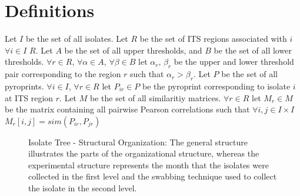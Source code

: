 \documentclass[12pt]{ucthesis}
\begin{document}
   \section{Definitions}\label{sec:definitions}
      Let $I$ be the set of all isolates. Let $R$ be the set of ITS regions
      associated with $i$ $\forall i \in I$ $R$. Let $A$ be the set of all upper
      thresholds, and $B$ be the set of all lower thresholds. $\forall r \in R$,
      $\forall \alpha \in A$, $\forall \beta \in B$ let $\alpha_r$, $\beta_r$ be the
      upper and lower threshold pair corresponding to the region $r$ such that
      $\alpha_r > \beta_r$. Let $P$ be the set of all pyroprints. $\forall i \in I$,
      $\forall r \in R$ let $P_{ir} \in P$ be the pyroprint corresponding to isolate
      $i$ at ITS region $r$. Let $M$ be the set of all similaritiy matrices.
      $\forall r \in R$ let $M_r \in M$ be the matrix containing all pairwise Pearson
      correlations such that $\forall i,j \in I \times I$ $M_r[i,j] = sim(P_{ir},
      P_{jr})$

      \begin{figure}[H]
      \centering
      \caption{Isolate Tree - Structural Organization: The general structure
      illustrates the parts of the organizational structure, whereas the experimental
      structure represents the month that the isolates were
      collected in the first level and the swabbing technique used to collect the
      isolate in the second level.}
      \end{figure}
\end{document}
